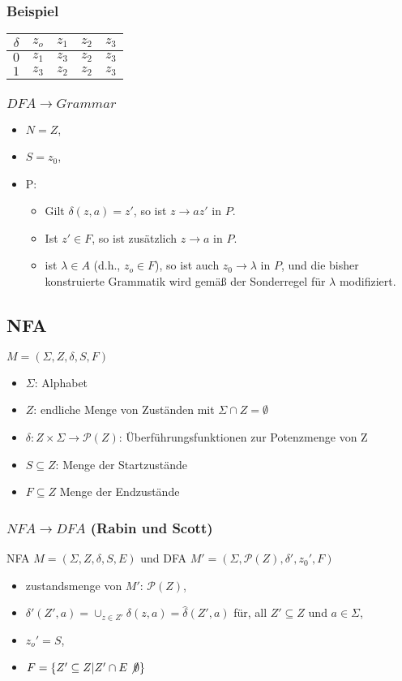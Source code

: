 \documentclass[9pt]{article}
\begin{document}
\subsubsection{Beispiel}
	\begin{tabular}{|c||c|c|c|c|}
		\hline
		$\delta$ & $z_o$ & $z_1$ & $z_2$ & $z_3$\\
		\hline \hline
		$0$ & $z_1$ & $z_3$ & $z_2$ & $z_3$\\
		\hline
		$1$ & $z_3$ & $z_2$ & $z_2$ & $z_3$\\
		\hline
	\end{tabular}
\subsubsection{$DFA \rightarrow Grammar$}
	\begin{itemize}
		\item $N = Z$,
		\item $S = z_0$,
		\item P:
		\begin{itemize}
			\item Gilt $\delta(z, a) = z'$, so ist $z \rightarrow az'$ in $P$.
			\item Ist $z' \in F$, so ist zusätzlich $z \rightarrow a$ in $P$.
			\item ist $\lambda \in A$ (d.h., $z_o \in F$), so ist auch $z_0 \rightarrow \lambda$ in $P$, und die bisher konstruierte Grammatik wird gemäß der Sonderregel für $\lambda$ modifiziert.
		\end{itemize}
	\end{itemize}
\subsection{NFA}
$M=(\Sigma, Z, \delta, S, F)$
\begin{itemize}
	\item $\Sigma$: Alphabet
	\item $Z$: endliche Menge von Zuständen mit $\Sigma \cap Z = \emptyset$
	\item $\delta: Z \times \Sigma \rightarrow \mathcal{P}(Z)$: Überführungsfunktionen zur Potenzmenge von Z
	\item $S \subseteq Z$: Menge der Startzustände
	\item $F \subseteq Z$ Menge der Endzustände
\end{itemize}
\subsubsection{$NFA \rightarrow DFA$ (Rabin und Scott)}
NFA $M = (\Sigma, Z, \delta, S, E)$ und DFA $M' = (\Sigma, \mathcal{P}(Z), \delta', z_0', F)$
\begin{itemize}
	\item zustandsmenge von $M'$: $\mathcal{P}(Z)$,
	\item $\delta'(Z', a)= \cup_{z\in Z'}\delta(z, a)=\hat\delta(Z', a)$ für, all $Z' \subseteq Z$ und $a \in \Sigma$,
	\item $z_o' = S$,
	\item $F = \{Z' \subseteq Z | Z' \cap E \not \emptyset\}$
\end{itemize}
\end{document}
